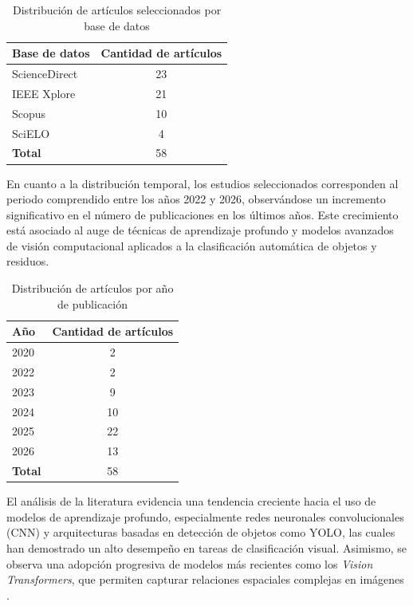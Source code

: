 \begin{table}[H]
\centering
\caption{Distribución de artículos seleccionados por base de datos}
\begin{tabular}{lc}
\hline
\textbf{Base de datos} & \textbf{Cantidad de artículos} \\
\hline
ScienceDirect & 23 \\
IEEE Xplore & 21 \\
Scopus & 10 \\
SciELO & 4 \\
\hline
\textbf{Total} & 58 \\
\hline
\end{tabular}
\end{table}

En cuanto a la distribución temporal, los estudios seleccionados corresponden al periodo comprendido entre los años 2022 y 2026, observándose un incremento significativo en el número de publicaciones en los últimos años. Este crecimiento está asociado al auge de técnicas de aprendizaje profundo y modelos avanzados de visión computacional aplicados a la clasificación automática de objetos y residuos.

\begin{table}[H]
\centering
\caption{Distribución de artículos por año de publicación}
\begin{tabular}{lc}
\hline
\textbf{Año} & \textbf{Cantidad de artículos} \\
\hline
2020 & 2 \\
2022 & 2 \\
2023 & 9 \\
2024 & 10 \\
2025 & 22 \\
2026 & 13 \\
\hline
\textbf{Total} & 58 \\
\hline
\end{tabular}
\end{table}

El análisis de la literatura evidencia una tendencia creciente hacia el uso de modelos de aprendizaje profundo, especialmente redes neuronales convolucionales (CNN) y arquitecturas basadas en detección de objetos como YOLO, las cuales han demostrado un alto desempeño en tareas de clasificación visual. Asimismo, se observa una adopción progresiva de modelos más recientes como los \textit{Vision Transformers}, que permiten capturar relaciones espaciales complejas en imágenes \cite{chauhanViT4WasteVisionTransformerBased2025, oiseEViTNetLightweightVision2026, donmez_benchmarking_2025}.\\

